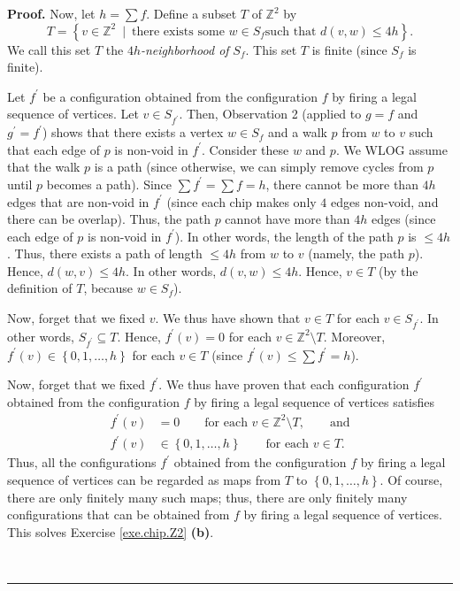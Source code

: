 \documentclass[numbers=enddot,12pt,final,onecolumn,notitlepage]{scrartcl}%
\theoremstyle{definition}
\newenvironment{proof}[1][Proof]{\noindent\textbf{#1.} }{\ \rule{0.5em}{0.5em}}
\let\sumnonlimits\sum
\renewcommand{\sum}{\sumnonlimits\limits}
\newcommand{\tup}[1]{\left( #1 \right)}
\begin{document}
\begin{proof}
Now, let $h=\sum f$. Define a subset $T$ of $\mathbb{Z}^{2}$ by%
\[
T=\left\{  v\in\mathbb{Z}^{2}\ \mid\ \text{there exists some }w\in S_{f}\text{
such that }d\left(  v,w\right)  \leq4h\right\}  .
\]
We call this set $T$ the $4h$\textit{-neighborhood of }$S_{f}$. This set $T$
is finite (since $S_{f}$ is finite).

Let $f^{\prime}$ be a configuration obtained from the configuration $f$ by
firing a legal sequence of vertices. Let $v\in S_{f^{\prime}}$. Then,
Observation 2 (applied to $g=f$ and $g^{\prime}=f^{\prime}$) shows that there
exists a vertex $w\in S_{f}$ and a walk $p$ from $w$ to $v$ such that each
edge of $p$ is non-void in $f^{\prime}$. Consider these $w$ and $p$. We WLOG
assume that the walk $p$ is a path (since otherwise, we can simply remove
cycles from $p$ until $p$ becomes a path). Since $\sum f^{\prime}=\sum f=h$,
there cannot be more than $4h$ edges that are non-void in $f^{\prime}$ (since
each chip makes only $4$ edges non-void, and there can be overlap). Thus, the
path $p$ cannot have more than $4h$ edges (since each edge of $p$ is non-void
in $f^{\prime}$). In other words, the length of the path $p$ is $\leq4h$.
Thus, there exists a path of length $\leq4h$ from $w$ to $v$ (namely, the path
$p$). Hence, $d\left(  w,v\right)  \leq4h$. In other words,
$d \tup{v, w} \leq 4h$.
Hence, $v\in T$ (by the definition of $T$, because $w\in S_{f}$).

Now, forget that we fixed $v$. We thus have shown that $v\in T$ for each $v\in
S_{f^{\prime}}$. In other words, $S_{f^{\prime}}\subseteq T$. Hence,
$f^{\prime}\left(  v\right)  =0$ for each $v\in\mathbb{Z}^{2}\setminus T$.
Moreover, $f^{\prime}\left(  v\right)  \in\left\{  0,1,\ldots,h\right\}  $ for
each $v\in T$ (since $f^{\prime}\left(  v\right)  \leq\sum f^{\prime}=h$).

Now, forget that we fixed $f^{\prime}$. We thus have proven that each
configuration $f^{\prime}$ obtained from the configuration $f$ by firing a
legal sequence of vertices satisfies
\begin{align*}
f^{\prime}\left(  v\right)   &  =0\qquad \text{for each }%
v\in\mathbb{Z}^{2}\setminus T,\qquad \text{and}\\
f^{\prime}\left(  v\right)   &  \in\left\{  0,1,\ldots,h\right\}
\qquad \text{for each }v\in T.
\end{align*}
Thus, all the configurations $f^{\prime}$ obtained from the configuration $f$ by
firing a legal sequence of vertices can be regarded as maps from $T$ to
$\left\{  0,1,\ldots,h\right\}  $. Of course, there are only finitely many
such maps; thus, there are only finitely many configurations that can be
obtained from $f$ by firing a legal sequence of vertices. This solves Exercise
\ref{exe.chip.Z2} \textbf{(b)}.


\end{proof}
\end{document}
